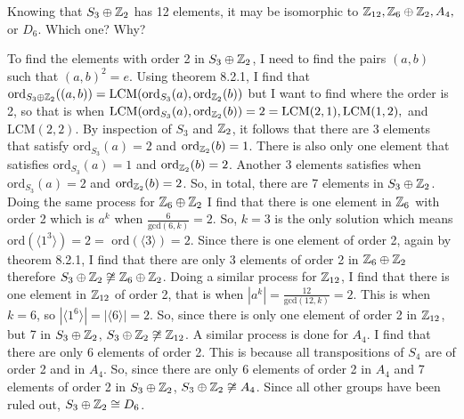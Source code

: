 \documentclass[titlepage]{article}
\begin{document}
\begin{problem}{9}
Knowing that $S_3 \oplus \mathbb{Z}_2$ has 12 elements, it may be isomorphic to $\mathbb{Z}_{12}, \mathbb{Z}_6 \oplus \mathbb{Z}_2, A_4, $ or $D_6.$ Which one? Why?
\end{problem}
\begin{solution}
To find the elements with order 2 in $S_3 \oplus \mathbb{Z}_2$, I need to find the pairs $(a,b)$ such that $(a,b)^2  = e$. Using theorem 8.2.1, I find that $\text{ord}_{S_3 \oplus \mathbb{Z}_2}((a,b)) = \text{LCM}(\text{ord}_{S_3}(a), \text{ord}_{\mathbb{Z}_2}(b))$ but I want to find where the order is 2, so that is when $\text{LCM}(\text{ord}_{S_3}(a), \text{ord}_{\mathbb{Z}_2}(b)) = 2 = \text{LCM}(2,1), \text{LCM}(1,2),$ and $\text{LCM}(2,2)$. By inspection of $S_3$ and $\mathbb{Z}_2$, it follows that there are 3 elements that satisfy $\text{ord}_{S_3}(a)= 2$ and $\text{ord}_{\mathbb{Z}_2}(b) = 1$. There is also only one element that satisfies $\text{ord}_{S_3}(a) = 1$ and $\text{ord}_{\mathbb{Z}_2}(b) =2$. Another 3 elements satisfies when $\text{ord}_{S_3}(a) = 2$ and $\text{ord}_{\mathbb{Z}_2}(b) = 2$. So, in total, there are 7 elements in $S_3 \oplus \mathbb{Z}_2$. Doing the same process for $\mathbb{Z}_6 \oplus \mathbb{Z}_2$ I find that there is one element in $\mathbb{Z}_6$ with order 2 which is $a^k$ when $\frac{6}{\text{gcd}(6,k)} = 2$. So, $k = 3$ is the only solution which means ord$(\langle 1^3 \rangle)= 2 =$ ord$(\langle3\rangle) = 2$. Since there is one element of order 2, again by theorem 8.2.1, I find that there are only 3 elements of order 2 in $\mathbb{Z}_6 \oplus \mathbb{Z}_2$ therefore $S_3 \oplus \mathbb{Z}_2 \not \cong \mathbb{Z}_6 \oplus \mathbb{Z}_2$. Doing a similar process for $\mathbb{Z}_{12}$, I find that there is one element in $\mathbb{Z}_{12}$ of order 2, that is when $|a^k| = \frac{12}{\text{gcd}(12,k)} = 2$. This is when $k = 6$, so $|\langle 1^6 \rangle| = |\langle 6 \rangle| = 2$. So, since there is only one element of order 2 in $\mathbb{Z}_{12}$, but 7 in $S_3 \oplus \mathbb{Z}_2$, $S_3 \oplus \mathbb{Z}_2 \not \cong \mathbb{Z}_{12}$. A similar process is done for $A_4$. I find that there are only 6 elements of order 2. This is because all transpositions of $S_4$ are of order 2 and in $A_4$. So, since there are only 6 elements of order 2 in $A_4$ and 7 elements of order 2 in $S_3 \oplus \mathbb{Z}_2$, $S_3 \oplus \mathbb{Z}_2 \not \cong A_4$. Since all other groups have been ruled out, $S_3 \oplus \mathbb{Z}_2 \cong D_6$.
\end{solution}
\end{document}
